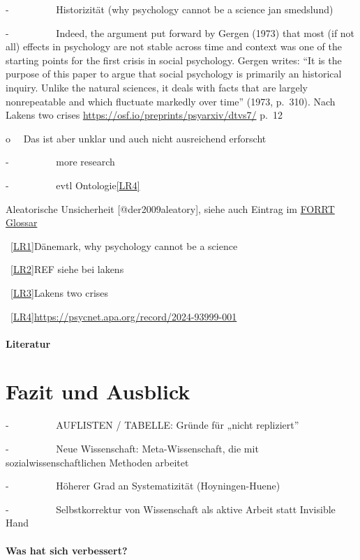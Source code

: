 \documentclass[
  letterpaper,
  DIV=11,
  numbers=noendperiod]{scrreprt}
\begin{document}
-~~~~~~~~~ Historizität (why psychology cannot be a science jan
smedslund)

-~~~~~~~~~ Indeed, the argument put forward by Gergen (1973) that most
(if not all) effects in psychology are not stable across time and
context was one of the starting points for the first crisis in social
psychology. Gergen writes: ``It is the purpose of this paper to argue
that social psychology is primarily an historical inquiry. Unlike the
natural sciences, it deals with facts that are largely nonrepeatable and
which fluctuate markedly over time'' (1973, p.~310). Nach Lakens two
crises \url{https://osf.io/preprints/psyarxiv/dtvs7/} p.~12

o~~ Das ist aber unklar und auch nicht ausreichend erforscht

-~~~~~~~~~ more research

-~~~~~~~~~ evtl Ontologie\hyperref[_msocom_4]{{[}LR4{]}}~

Aleatorische Unsicherheit {[}@der2009aleatory{]}, siehe auch Eintrag im
\href{https://forrt.org/glossary/german/aleatoric_uncertainty/}{FORRT
Glossar}

~\hyperref[_msoanchor_1]{{[}LR1{]}}Dänemark, why psychology cannot be a
science

~\hyperref[_msoanchor_2]{{[}LR2{]}}REF siehe bei lakens

~\hyperref[_msoanchor_3]{{[}LR3{]}}Lakens two crises

~\hyperref[_msoanchor_4]{{[}LR4{]}}\url{https://psycnet.apa.org/record/2024-93999-001}

\subsection{Literatur}\label{literatur-14}

\part{Fazit und Ausblick}

-~~~~~~~~~ AUFLISTEN / TABELLE: Gründe für „nicht repliziert''

-~~~~~~~~~ Neue Wissenschaft: Meta-Wissenschaft, die mit
sozialwissenschaftlichen Methoden arbeitet

-~~~~~~~~~ Höherer Grad an Systematizität (Hoyningen-Huene)

-~~~~~~~~~ Selbstkorrektur von Wissenschaft als aktive Arbeit statt
Invisible Hand

\subsection*{Was hat sich verbessert?}\label{was-hat-sich-verbessert}
\end{document}
